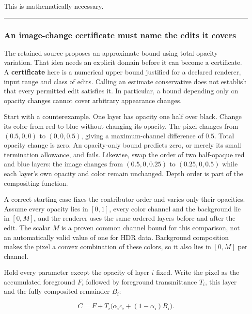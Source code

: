 This is mathematically necessary.

\begin{center}\rule{0.5\linewidth}{0.5pt}\end{center}

\subsubsection{An image-change certificate must name the edits it covers}\label{an-image-change-certificate-must-name-the-edits-it-covers}

The retained source proposes an approximate bound using total opacity variation. That idea needs an explicit domain before it can become a certificate. A \textbf{certificate} here is a numerical upper bound justified for a declared renderer, input range and class of edits. Calling an estimate conservative does not establish that every permitted edit satisfies it. In particular, a bound depending only on opacity changes cannot cover arbitrary appearance changes.

Start with a counterexample. One layer has opacity one half over black. Change its color from red to blue without changing its opacity. The pixel changes from \((0.5,0,0)\) to \((0,0,0.5)\), giving a maximum-channel difference of \(0.5\). Total opacity change is zero. An opacity-only bound predicts zero, or merely its small termination allowance, and fails. Likewise, swap the order of two half-opaque red and blue layers: the image changes from \((0.5,0,0.25)\) to \((0.25,0,0.5)\) while each layer's own opacity and color remain unchanged. Depth order is part of the compositing function.

A correct starting case fixes the contributor order and varies only their opacities. Assume every opacity lies in \([0,1]\), every color channel and the background lie in \([0,M]\), and the renderer uses the same ordered layers before and after the edit. The scalar \(M\) is a proven common channel bound for this comparison, not an automatically valid value of one for HDR data. Background composition makes the pixel a convex combination of these colors, so it also lies in \([0,M]\) per channel.

Hold every parameter except the opacity of layer \(i\) fixed. Write the pixel as the accumulated foreground \(F\), followed by foreground transmittance \(T_i\), this layer and the fully composited remainder \(B_i\):

\[
C=F+T_i\bigl(\alpha_i c_i+(1-\alpha_i)B_i\bigr).
\]

